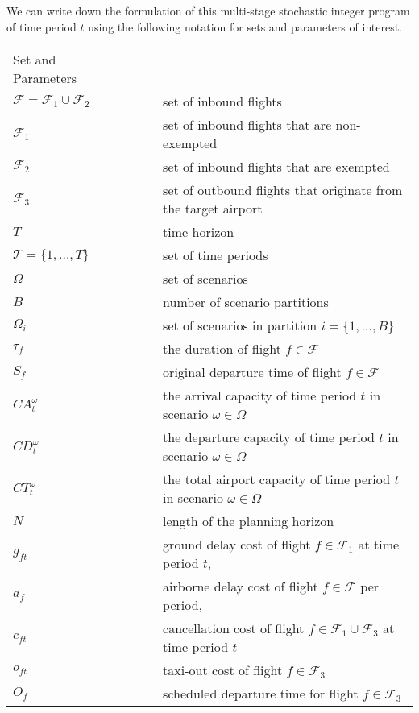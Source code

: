 \documentclass[12pt]{article}
\begin{document}
	\newline We can write down the formulation of this multi-stage stochastic integer program of time period \(t\) using the following notation for sets and parameters of interest.
	\begin{longtable}[H]{l l l}
		Set and Parameters & &\\
		\(\mathcal{F} = \mathcal{F}_1 \cup \mathcal{F}_2\) & \(\qquad\)& set of inbound flights\\
		\(\mathcal{F}_1\) & \(\qquad\)& set of inbound flights that are non-exempted\\
		\(\mathcal{F}_2\) & \(\qquad\)& set of inbound flights that are exempted\\
		\(\mathcal{F}_3\) & \(\qquad\)& set of outbound flights that originate from the target airport\\
		\(T\) & \(\qquad\) & time horizon\\
		\(\mathcal{T} = \{1, \dots,T\}\) & \(\qquad\) & set of time periods\\
		\(\Omega\) & \(\qquad\) & set of scenarios\\
		\(B\) & \(\qquad\) & number of scenario partitions \\
		\(\Omega_i\) & \(\qquad\) & set of scenarios in partition \(i = \{1, \dots, B\}\)\\
		\(\tau_f\) & \(\qquad\) & the duration of flight \(f \in \mathcal{F}\)\\
		\(S_f\) & \(\qquad\) & original departure time of flight \(f\in \mathcal{F}\)\\
		\(CA_t^\omega\)  & \(\qquad\) & the arrival capacity of time period \(t\) in scenario \(\omega \in \Omega\)\\
		\(CD_t^\omega\)  & \(\qquad\) & the departure capacity of time period \(t\) in scenario \(\omega \in \Omega\)\\
		\(CT_t^\omega\)  & \(\qquad\) & the total airport capacity of time period \(t\) in scenario \(\omega \in \Omega\)\\
		\(N\) & \(\qquad\) & length of the planning horizon \\
		\(g_{ft}\) & \(\qquad\) & ground delay cost of flight \(f \in \mathcal{F}_1\) at time period \(t\), \\
		\(a_{f}\) & \(\qquad\) & airborne delay cost of flight \(f \in \mathcal{F}\) per period, \\
		\(c_{ft}\) & \(\qquad\) & cancellation cost of flight \(f \in \mathcal{F}_1 \cup \mathcal{F}_3\) at time period \(t\)\\
		\(o_{ft}\) & \(\qquad\) & taxi-out cost of flight \(f \in \mathcal{F}_3\)\\
		\(O_{f}\) & \(\qquad\) & scheduled departure time for flight \(f \in \mathcal{F}_3\)\\
	\end{longtable}
\end{document}
